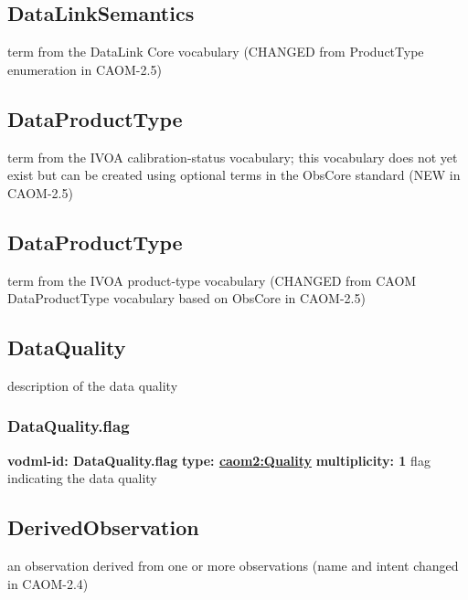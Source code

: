   \subsection{DataLinkSemantics}
  \label{sect:DataLinkSemantics}
    term from the DataLink Core vocabulary (CHANGED from ProductType enumeration in CAOM-2.5)

  \subsection{DataProductType}
  \label{sect:CalibrationStatus}
    term from the IVOA calibration-status vocabulary; this vocabulary does not yet exist but can be created using optional terms in the ObsCore standard (NEW in CAOM-2.5)

  \subsection{DataProductType}
  \label{sect:DataProductType}
    term from the IVOA product-type vocabulary (CHANGED from CAOM DataProductType vocabulary based on ObsCore in CAOM-2.5)

  \subsection{DataQuality}
  \label{sect:DataQuality}
    description of the data quality

    \subsubsection{DataQuality.flag}
      \textbf{vodml-id: DataQuality.flag} \newline
      \textbf{type: \hyperref[sect:Quality]{caom2:Quality}} \newline
      \textbf{multiplicity: 1} \newline
      flag indicating the data quality

  \subsection{DerivedObservation}
  \label{sect:DerivedObservation}
    an observation derived from one or more observations (name and intent changed in CAOM-2.4)

